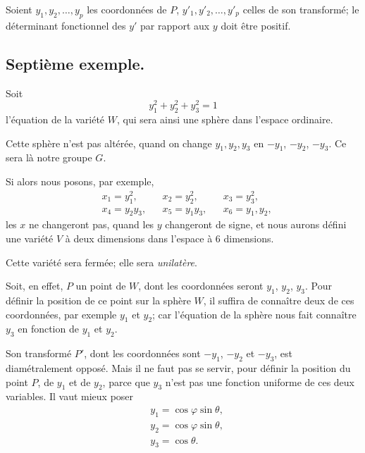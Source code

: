 \documentclass{article}
\begin{document}
Soient $y_{1}, y_{2}, \ldots, y_{p}$ les coordonnées de $P$, $y'_{1}, y'_{2}, \ldots, y'_{p}$ celles de son transformé; le déterminant fonctionnel des $y'$ par rapport aux $y$ doit être positif.

\subsection*{Septième exemple.}

Soit
\[ y^{2}_{1} + y^{2}_{2} + y^{2}_{3} = 1 \]
l'équation de la variété $W$, qui sera ainsi une sphère dans l'espace ordinaire.

Cette sphère n'est pas altérée, quand on change $y_{1}, y_{2}, y_{3}$ en $-y_{1}$, $-y_{2}$, $-y_{3}$. Ce sera là notre groupe $G$.

Si alors nous posons, par exemple,
\[ \begin{aligned} &x_{1} = y^{2}_{1}, &&x_{2} = y^{2}_{2}, &&x_{3} = y^{2}_{3},\\ &x_{4} = y_{2}y_{3}, &&x_{5} = y_{1}y_{3}, &&x_{6} = y_{1}, y_{2}, \end{aligned} \]
les $x$ ne changeront pas, quand les $y$ changeront de signe, et nous aurons défini une variété $V$ à deux dimensions dans l'espace à 6 dimensions.

Cette variété sera fermée; elle sera \emph{unilatère}.

Soit, en effet, $P$ un point de $W$, dont les coordonnées seront $y_{1}$, $y_{2}$, $y_{3}$. Pour définir la position de ce point sur la sphère $W$, il suffira de connaître deux de ces coordonnées, par exemple $y_{1}$ et $y_{2}$; car l'équation de la sphère nous fait connaître $y_{3}$ en fonction de $y_{1}$ et $y_{2}$.

Son transformé $P'$, dont les coordonnées sont $-y_{1}$, $-y_{2}$ et $-y_{3}$, est diamétralement opposé. Mais il ne faut pas se servir, pour définir la position du point $P$, de $y_{1}$ et de $y_{2}$, parce que $y_{3}$ n'est pas une fonction uniforme de ces deux variables. Il vaut mieux poser
\[ \begin{aligned} &y_{1} = \cos \varphi \sin \theta,\\ &y_{2} = \cos \varphi \sin \theta,\\ &y_{3} = \cos \theta. \end{aligned} \]
\end{document}
